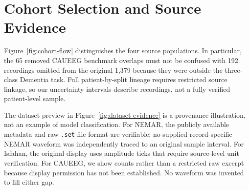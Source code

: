 \section{Cohort Selection and Source Evidence}

Figure~\ref{fig:cohort-flow} distinguishes the four source populations. In particular, the 65 removed CAUEEG benchmark overlaps must not be confused with 192 recordings omitted from the original 1,379 because they were outside the three-class Dementia task. Full patient-by-split lineage requires restricted source linkage, so our uncertainty intervals describe recordings, not a fully verified patient-level sample.


The dataset preview in Figure~\ref{fig:dataset-evidence} is a provenance illustration, not an example of model classification. For NEMAR, the publicly available metadata and raw \texttt{.set} file format are verifiable; no supplied record-specific NEMAR waveform was independently traced to an original sample interval. For Isfahan, the original display uses amplitude ticks that require source-level unit verification. For CAUEEG, we show counts rather than a restricted raw excerpt because display permission has not been established. No waveform was invented to fill either gap.

